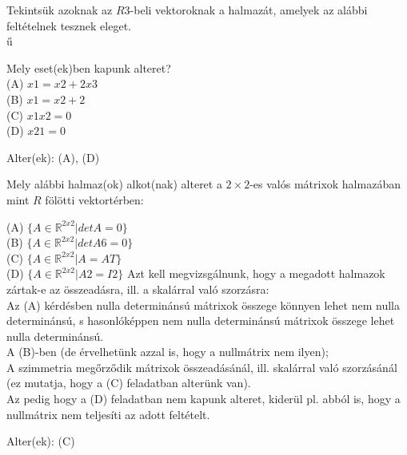 \begin{frame}
  \begin{tcolorbox}[title={2/3. -R-}]
      Tekintsük azoknak az $R3$-beli  vektoroknak a halmazát, amelyek az alábbi feltételnek tesznek eleget.\\ű
      
      Mely eset(ek)ben kapunk alteret?\\
      (A) $x1 = x2 + 2x3$\\
      (B) $x1 = x2 + 2$\\
      (C) $x1x2 = 0$\\
      (D) $x2 1 = 0$
  \tcblower

    \mmedskip
    
    Alter(ek): (A), (D)
  \end{tcolorbox}
\end{frame}

\begin{frame}
  \begin{tcolorbox}[title={2/4. -Q-}]
      Mely alábbi halmaz(ok) alkot(nak) alteret a $2×2$-es valós mátrixok halmazában mint $R$ fölötti vektortérben:\\
      \mmedskip
      
      (A) $\{A ∈ \mathbb{R}^{2 x 2}|detA = 0\}$\\
      (B) $\{A ∈ \mathbb{R}^{2 x 2}|detA 6= 0\}$\\
      (C) $\{A ∈ \mathbb{R}^{2 x 2}|A = AT\}$\\
      (D) $\{A ∈ \mathbb{R}^{2 x 2}|A2 = I2\}$
  \tcblower
    Azt kell megvizsgálnunk, hogy a megadott halmazok zártak-e az összeadásra, ill. a skalárral való szorzásra:\\

    Az (A) kérdésben nulla determinánsú mátrixok összege könnyen lehet nem nulla determinánsú, s hasonlóképpen nem nulla determinánsú mátrixok összege lehet nulla determinánsú.\\
    
    A (B)-ben (de érvelhetünk azzal is, hogy a nullmátrix nem ilyen);\\

    A szimmetria megőrződik mátrixok összeadásánál, ill. skalárral való szorzásánál (ez mutatja, hogy a (C) feladatban alterünk van).\\

    Az pedig hogy a (D) feladatban nem kapunk alteret, kiderül pl. abból is, hogy a nullmátrix nem teljesíti az adott feltételt. 
    \mmedskip 
    
    Alter(ek): (C)
  \end{tcolorbox}
\end{frame}

